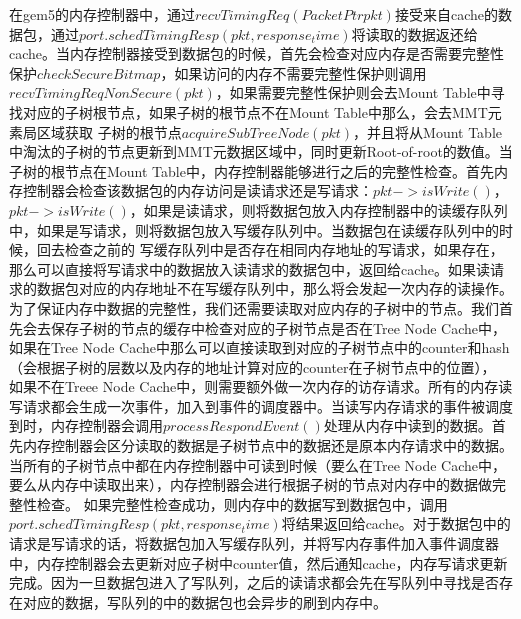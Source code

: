 在gem5的内存控制器中，通过$recvTimingReq(PacketPtr pkt)$接受来自cache的数据包，通过$port.schedTimingResp(pkt, response_time)$将读取的数据返还给cache。当内存控制器接受到数据包的时候，首先会检查对应内存是否需要完整性保护$checkSecureBitmap$，如果访问的内存不需要完整性保护则调用$recvTimingReqNonSecure(pkt)$，如果需要完整性保护则会去Mount Table中寻找对应的子树根节点，如果子树的根节点不在Mount Table中那么，会去MMT元素局区域获取
子树的根节点$acquireSubTreeNode(pkt)$，并且将从Mount Table中淘汰的子树的节点更新到MMT元数据区域中，同时更新Root-of-root的数值。当子树的根节点在Mount Table中，内存控制器能够进行之后的完整性检查。首先内存控制器会检查该数据包的内存访问是读请求还是写请求：$pkt->isWrite()$，$pkt->isWrite()$，如果是读请求，则将数据包放入内存控制器中的读缓存队列中，如果是写请求，则将数据包放入写缓存队列中。当数据包在读缓存队列中的时候，回去检查之前的
写缓存队列中是否存在相同内存地址的写请求，如果存在，那么可以直接将写请求中的数据放入读请求的数据包中，返回给cache。如果读请求的数据包对应的内存地址不在写缓存队列中，那么将会发起一次内存的读操作。为了保证内存中数据的完整性，我们还需要读取对应内存的子树中的节点。我们首先会去保存子树的节点的缓存中检查对应的子树节点是否在Tree Node Cache中，如果在Tree Node Cache中那么可以直接读取到对应的子树节点中的counter和hash（会根据子树的层数以及内存的地址计算对应的counter在子树节点中的位置），
如果不在Treee Node Cache中，则需要额外做一次内存的访存请求。所有的内存读写请求都会生成一次事件，加入到事件的调度器中。当读写内存请求的事件被调度到时，内存控制器会调用$processRespondEvent()$处理从内存中读到的数据。首先内存控制器会区分读取的数据是子树节点中的数据还是原本内存请求中的数据。当所有的子树节点中都在内存控制器中可读到时候（要么在Tree Node Cache中，要么从内存中读取出来），内存控制器会进行根据子树的节点对内存中的数据做完整性检查。
如果完整性检查成功，则内存中的数据写到数据包中，调用$port.schedTimingResp(pkt, response_time)$将结果返回给cache。对于数据包中的请求是写请求的话，将数据包加入写缓存队列，并将写内存事件加入事件调度器中，内存控制器会去更新对应子树中counter值，然后通知cache，内存写请求更新完成。因为一旦数据包进入了写队列，之后的读请求都会先在写队列中寻找是否存在对应的数据，写队列的中的数据包也会异步的刷到内存中。
